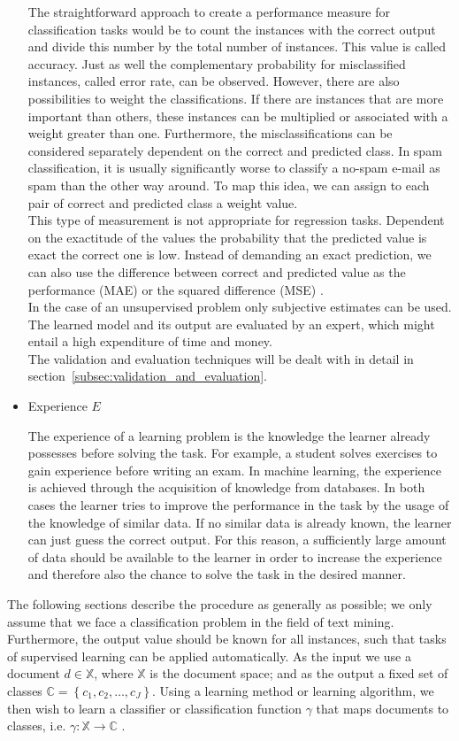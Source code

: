 \documentclass[article,type=msc,colorback,accentcolor=tud7b]{tudthesis}
\begin{document}
\begin{itemize}
        The straightforward approach to create a performance measure for classification tasks would be to count the instances with the correct output and divide this number by the total number of instances. This value is called accuracy. Just as well the complementary probability for misclassified instances, called error rate, can be observed. However, there are also possibilities to weight the classifications. If there are instances that are more important than others, these instances can be multiplied or associated with a weight greater than one. Furthermore, the misclassifications can be considered separately dependent on the correct and predicted class. In spam classification, it is usually significantly worse to classify a no-spam e-mail as spam than the other way around. To map this idea, we can assign to each pair of correct and predicted class a weight value. \\
        This type of measurement is not appropriate for regression tasks. Dependent on the exactitude of the values the probability that the predicted value is exact the correct one is low. Instead of demanding an exact prediction, we can also use the difference between correct and predicted value as the performance (MAE) or the squared difference (MSE) \autocite[section~5.8]{Witten2005}. \\
        In the case of an unsupervised problem only subjective estimates can be used. The learned model and its output are evaluated by an expert, which might entail a high expenditure of time and money. \\
        The validation and evaluation techniques will be dealt with in detail in section~\ref{subsec:validation_and_evaluation}.
      \item Experience $E$
      
        The experience of a learning problem is the knowledge the learner already possesses before solving the task. For example, a student solves exercises to gain experience before writing an exam. In machine learning, the experience is achieved through the acquisition of knowledge from databases. In both cases the learner tries to improve the performance in the task by the usage of the knowledge of similar data. If no similar data is already known, the learner can just guess the correct output. For this reason, a sufficiently large amount of data should be available to the learner in order to increase the experience and therefore also the chance to solve the task in the desired manner.
    \end{itemize}
    The following sections describe the procedure as generally as possible; we only assume that we face a classification problem in the field of text mining. Furthermore, the output value should be known for all instances, such that tasks of supervised learning can be applied automatically. As the input we use a document $d\in\mathbb{X}$, where $\mathbb{X}$ is the document space; and as the output a fixed set of classes $\mathbb{C}=\left\{c_{1},c_{2},\dots,c_{J}\right\}$. Using a learning method or learning algorithm, we then wish to learn a classifier or classification function $\gamma$ that maps documents to classes, i.e. $\gamma:\mathbb{X}\rightarrow\mathbb{C}$ \autocite[section~13.1]{Manning2008}.
  
\end{document}
